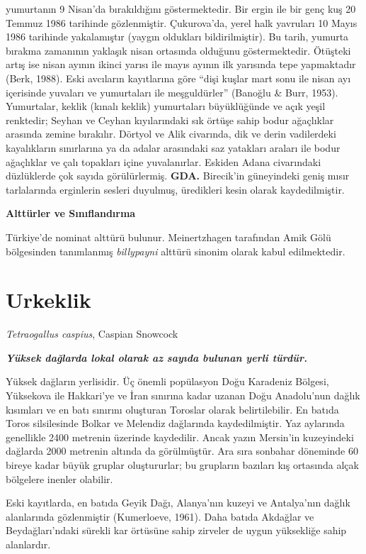 \documentclass[
  a4paper,
  DIV=11,
  numbers=noendperiod]{scrreprt}
\begin{document}
yumurtanın 9 Nisan'da bırakıldığını göstermektedir. Bir ergin ile bir
genç kuş 20 Temmuz 1986 tarihinde gözlenmiştir. Çukurova'da, yerel halk
yavruları 10 Mayıs 1986 tarihinde yakalamıştır (yaygın oldukları
bildirilmiştir). Bu tarih, yumurta bırakma zamanının yaklaşık nisan
ortasında olduğunu göstermektedir. Ötüşteki artış ise nisan ayının
ikinci yarısı ile mayıs ayının ilk yarısında tepe yapmaktadır (Berk,
1988). Eski avcıların kayıtlarına göre ``dişi kuşlar mart sonu ile nisan
ayı içerisinde yuvaları ve yumurtaları ile meşguldürler'' (Banoğlu \&
Burr, 1953). Yumurtalar, keklik (kınalı keklik) yumurtaları büyüklüğünde
ve açık yeşil renktedir; Seyhan ve Ceyhan kıyılarındaki sık örtüşe sahip
bodur ağaçlıklar arasında zemine bırakılır. Dörtyol ve Alik civarında,
dik ve derin vadilerdeki kayalıkların sınırlarına ya da adalar
arasındaki saz yatakları araları ile bodur ağaçlıklar ve çalı topakları
içine yuvalanırlar. Eskiden Adana civarındaki düzlüklerde çok sayıda
görülürlermiş. \textbf{GDA.} Birecik'in güneyindeki geniş mısır
tarlalarında erginlerin sesleri duyulmuş, üredikleri kesin olarak
kaydedilmiştir.

\textbf{Alttürler ve Sınıflandırma}

Türkiye'de nominat alttürü bulunur. Meinertzhagen tarafından Amik Gölü
bölgesinden tanımlanmış \emph{billypayni} alttürü sinonim olarak kabul
edilmektedir.

\section{Urkeklik}\label{urkeklik}

\emph{Tetraogallus caspius}, Caspian Snowcock

\textbf{\emph{Yüksek dağlarda lokal olarak az sayıda bulunan yerli
türdür.}}

Yüksek dağların yerlisidir. Üç önemli popülasyon Doğu Karadeniz Bölgesi,
Yüksekova ile Hakkari'ye ve İran sınırına kadar uzanan Doğu Anadolu'nun
dağlık kısımları ve en batı sınırını oluşturan Toroslar olarak
belirtilebilir. En batıda Toros silsilesinde Bolkar ve Melendiz
dağlarında kaydedilmiştir. Yaz aylarında genellikle 2400 metrenin
üzerinde kaydedilir. Ancak yazın Mersin'in kuzeyindeki dağlarda 2000
metrenin altında da görülmüştür. Ara sıra sonbahar döneminde 60 bireye
kadar büyük gruplar oluştururlar; bu grupların bazıları kış ortasında
alçak bölgelere inenler olabilir.

Eski kayıtlarda, en batıda Geyik Dağı, Alanya'nın kuzeyi ve Antalya'nın
dağlık alanlarında gözlenmiştir (Kumerloeve, 1961). Daha batıda Akdağlar
ve Beydağları'ndaki sürekli kar örtüsüne sahip zirveler de uygun
yüksekliğe sahip alanlardır.
\end{document}
